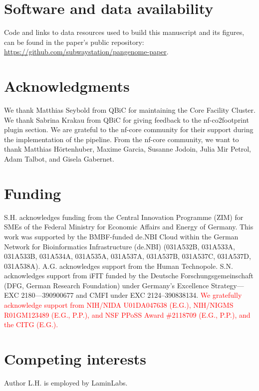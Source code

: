 \documentclass{bioinfo}
\theoremstyle{definition}
\newcommand{\red}[1]{{\textcolor{Red}{#1}}}
\begin{document}
	\section*{Software and data availability}
	
	Code and links to data resources used to build this manuscript and its figures, can be found in the paper’s public repository: \href{https://github.com/subwaystation/pangenome-paper}{https://github.com/subwaystation/pangenome-paper}.
	\vspace{-0.6cm}
	\section*{Acknowledgments}

	We thank Matthias Seybold from QBiC for maintaining the Core Facility Cluster. 
	We thank Sabrina Krakau from QBiC for giving feedback to the nf-co2footprint plugin section. 
	We are grateful to the nf-core community for their support during the implementation of the pipeline. 
	From the nf-core community, we want to thank Matthias Hörtenhuber, Maxime Garcia, Susanne Jodoin, Julia Mir Petrol, Adam Talbot, and Gisela Gabernet. 

	\vspace{-0.6cm}
	
	\section*{Funding}
	
	 S.H. acknowledges funding from the Central Innovation Programme (ZIM) for SMEs of the Federal Ministry for Economic Affairs and Energy of Germany. This work was supported by the BMBF-funded de.NBI Cloud within the German Network for Bioinformatics Infrastructure (de.NBI) (031A532B, 031A533A, 031A533B, 031A534A, 031A535A, 031A537A, 031A537B, 031A537C, 031A537D, 031A538A). A.G. acknowledges support from the Human Technopole. S.N. acknowledges support from iFIT funded by the Deutsche Forschungsgemeinschaft (DFG, German Research Foundation) under Germany’s Excellence Strategy—EXC 2180—390900677 and CMFI under EXC 2124–390838134. 
     \red{We gratefully acknowledge support from NIH/NIDA U01DA047638 (E.G.), NIH/NIGMS R01GM123489 (E.G., P.P.), and NSF PPoSS Award \#2118709 (E.G., P.P.), and the CITG (E.G.).}
	 
	\vspace{-0.6cm}
	
	\section*{Competing interests}
	Author L.H. is employed by LaminLabs.
	
\end{document}
